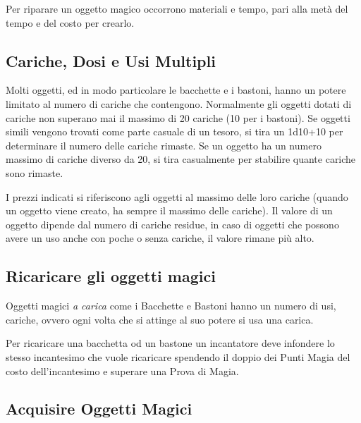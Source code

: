 \begin{multicols}{2}
Per riparare un oggetto magico occorrono materiali e tempo, pari alla metà del tempo e del costo per crearlo.

\subsection{Cariche, Dosi e Usi Multipli}

\label{cariche-dosi-e-usi-multipli}

Molti oggetti, ed in modo particolare le bacchette e i bastoni, hanno un potere limitato al numero di cariche che contengono. Normalmente gli oggetti dotati di cariche non superano mai il massimo di 20 cariche (10 per i bastoni). Se oggetti simili vengono trovati come parte casuale di un tesoro, si tira un 1d10+10 per determinare il numero delle cariche rimaste. Se un oggetto ha un numero massimo di cariche diverso da 20, si tira casualmente per stabilire quante cariche sono rimaste.

I prezzi indicati si riferiscono agli oggetti al massimo delle loro cariche (quando un oggetto viene creato, ha sempre il massimo delle cariche). Il valore di un oggetto dipende dal numero di cariche residue, in caso di oggetti che possono avere un uso anche con poche o senza cariche, il valore rimane più alto.

\subsection{Ricaricare gli oggetti magici}\label{Ricaricare gli oggetti magici}

Oggetti magici \emph{a carica} come i Bacchette e Bastoni hanno un numero di usi, cariche, ovvero ogni volta che si attinge al suo potere si usa una carica.

Per ricaricare una bacchetta od un bastone un incantatore deve infondere lo stesso incantesimo che vuole ricaricare spendendo il doppio dei Punti Magia del costo dell'incantesimo e superare una Prova di Magia.


\end{multicols}

\subsection{Acquisire Oggetti Magici}

\label{acquisire-oggetti-magici}

